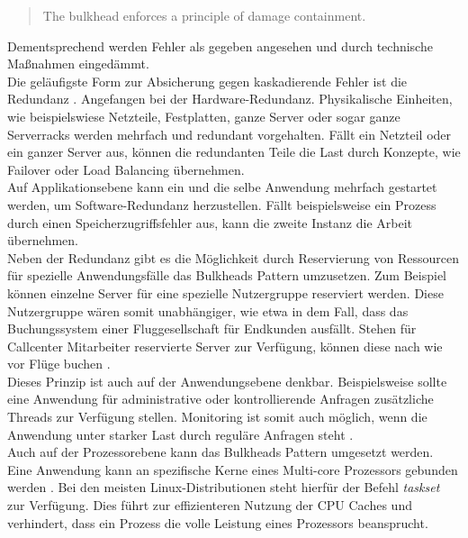 \begin{quotation}
The bulkhead enforces a principle of damage containment.
\end{quotation}

Dementsprechend werden Fehler als gegeben angesehen und durch technische Maßnahmen eingedämmt.\\

Die geläufigste Form zur Absicherung gegen kaskadierende Fehler ist die Redundanz \cite{friedrichsen_unkaputtbar_2014} \cite[S.~95]{nygard_release_2007}. Angefangen bei der Hardware-Redundanz. Physikalische Einheiten, wie beispielswiese Netzteile, Festplatten, ganze Server oder sogar ganze Serverracks werden mehrfach und redundant vorgehalten. Fällt ein Netzteil oder ein ganzer Server aus, können die redundanten Teile die Last durch Konzepte, wie Failover oder Load Balancing übernehmen.\\
Auf Applikationsebene kann ein und die selbe Anwendung mehrfach gestartet werden, um Software-Redundanz herzustellen. Fällt beispielsweise ein Prozess durch einen Speicherzugriffsfehler aus, kann die zweite Instanz die Arbeit übernehmen.\\

Neben der Redundanz gibt es die Möglichkeit durch Reservierung von Ressourcen für spezielle Anwendungsfälle das Bulkheads Pattern umzusetzen. Zum Beispiel können einzelne Server für eine spezielle Nutzergruppe reserviert werden. Diese Nutzergruppe wären somit unabhängiger, wie etwa in dem Fall, dass das Buchungssystem einer Fluggesellschaft für Endkunden ausfällt. Stehen für Callcenter Mitarbeiter reservierte Server zur Verfügung, können diese nach wie vor Flüge buchen \cite[S.~96]{nygard_release_2007}.\\

Dieses Prinzip ist auch auf der Anwendungsebene denkbar. Beispielsweise sollte eine Anwendung für administrative oder kontrollierende Anfragen zusätzliche Threads zur Verfügung stellen. Monitoring ist somit auch möglich, wenn die Anwendung unter starker Last durch reguläre Anfragen steht \cite[S.~98]{nygard_release_2007}.\\

Auch auf der Prozessorebene kann das Bulkheads Pattern umgesetzt werden. Eine Anwendung kann an spezifische Kerne eines Multi-core Prozessors gebunden werden \cite[S.~97]{nygard_release_2007}. Bei den meisten Linux-Distributionen steht hierfür der Befehl \textit{taskset} zur Verfügung. Dies führt zur effizienteren Nutzung der CPU Caches und verhindert, dass ein Prozess die volle Leistung eines Prozessors beansprucht.\\

